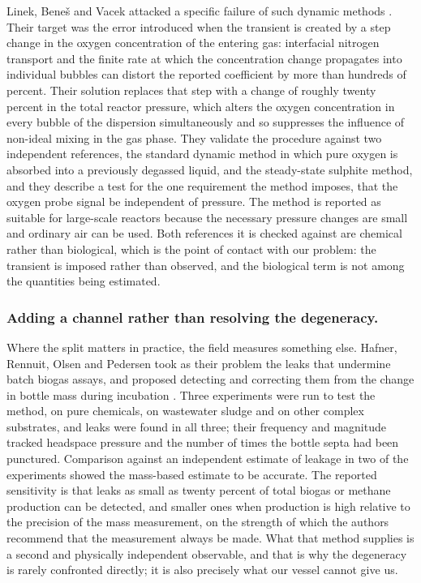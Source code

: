 \documentclass[runningheads]{llncs}
\begin{document}
Linek, Bene\v{s} and Vacek attacked a specific failure of such dynamic
methods \cite{linek1989dynamic}. Their target was the error introduced
when the transient is created by a step change in the oxygen
concentration of the entering gas: interfacial nitrogen transport and
the finite rate at which the concentration change propagates into
individual bubbles can distort the reported coefficient by more than
hundreds of percent. Their solution replaces that step with a change of
roughly twenty percent in the total reactor pressure, which alters the
oxygen concentration in every bubble of the dispersion simultaneously
and so suppresses the influence of non-ideal mixing in the gas phase.
They validate the procedure against two independent references, the
standard dynamic method in which pure oxygen is absorbed into a
previously degassed liquid, and the steady-state sulphite method, and
they describe a test for the one requirement the method imposes, that
the oxygen probe signal be independent of pressure. The method is
reported as suitable for large-scale reactors because the necessary
pressure changes are small and ordinary air can be used. Both
references it is checked against are chemical rather than biological,
which is the point of contact with our problem: the transient is
imposed rather than observed, and the biological term is not among the
quantities being estimated.

\subsubsection{Adding a channel rather than resolving the degeneracy.}
Where the split matters in practice, the field measures something else.
Hafner, Rennuit, Olsen and Pedersen took as their problem the leaks
that undermine batch biogas assays, and proposed detecting and
correcting them from the change in bottle mass during
incubation \cite{hafner2018quantification}. Three experiments were run
to test the method, on pure chemicals, on wastewater sludge and on
other complex substrates, and leaks were found in all three; their
frequency and magnitude tracked headspace pressure and the number of
times the bottle septa had been punctured. Comparison against an
independent estimate of leakage in two of the experiments showed the
mass-based estimate to be accurate. The reported sensitivity is that
leaks as small as twenty percent of total biogas or methane production
can be detected, and smaller ones when production is high relative to
the precision of the mass measurement, on the strength of which the
authors recommend that the measurement always be made. What that
method supplies is a second and physically independent observable, and
that is why the degeneracy is rarely confronted directly; it is also
precisely what our vessel cannot give us.
\end{document}
